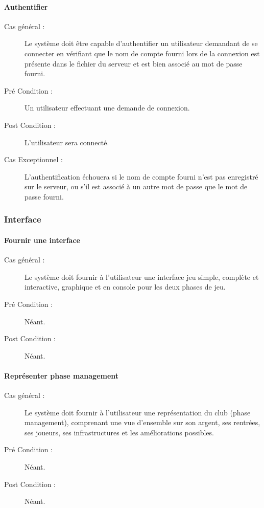 \documentclass[a4paper]{article}
\begin{document}
\paragraph{Authentifier}
\begin{description}
\item[Cas général :] Le système doit être capable d'authentifier un \gls{utilisateur} demandant de se connecter en vérifiant que le nom de compte fourni lors de la connexion est présente dans le fichier du \gls{serveur} et est bien associé au mot de passe fourni.
\item[Pré Condition  :] Un \gls{utilisateur} effectuant une demande de connexion.
\item[Post Condition :] L'\gls{utilisateur} sera connecté.
\item[Cas Exceptionnel :] L'authentification échouera si le nom de compte fourni n'est pas enregistré sur le \gls{serveur}, ou s'il est associé à un autre mot de passe que le mot de passe fourni.
\end{description}

\subsubsection{Interface}
\paragraph{Fournir une interface}
\begin{description}
\item[Cas général :] Le système doit fournir à l'\gls{utilisateur} une interface jeu simple, complète et interactive, graphique et en console pour les deux phases de jeu.
\item[Pré Condition  :] Néant.
\item[Post Condition :] Néant.
\end{description}

\paragraph{Représenter phase management}
\begin{description}
\item[Cas général :] Le système doit fournir à l'\gls{utilisateur} une représentation du \gls{club} (phase management), comprenant une vue d'ensemble sur son argent, ses rentrées, ses \glspl{joueur}, ses infrastructures et les améliorations possibles.
\item[Pré Condition  :] Néant.
\item[Post Condition :] Néant.
\end{description}
\end{document}
